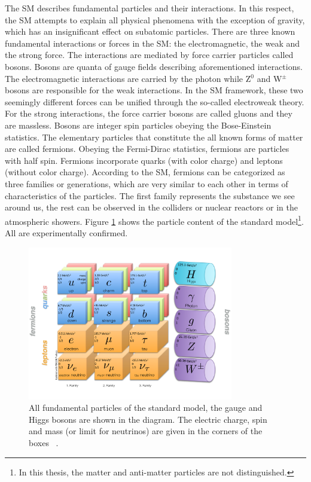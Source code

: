 The SM describes fundamental particles and their interactions. In this respect, the SM attempts to explain all physical phenomena with the exception of gravity, which has an insignificant effect on subatomic particles. There are three known fundamental interactions or forces in the SM: the electromagnetic, the weak and the strong force. The interactions are mediated by force carrier particles called bosons. Bosons are quanta of gauge fields describing aforementioned interactions. The electromagnetic interactions are carried by the photon while Z$^0$ and W$^{\pm}$ bosons are responsible for the weak interactions. In the SM framework, these two seemingly different forces can be unified through the so-called electroweak theory. For the strong interactions, the force carrier bosons are called gluons and they are massless. Bosons are integer spin particles obeying the Bose-Einstein statistics.
The elementary particles that constitute the all known forms of matter are called fermions.
Obeying the Fermi-Dirac statistics, fermions are particles with half spin.  Fermions incorporate quarks (with color charge) and leptons (without color charge). According to the SM, fermions can be categorized as three families or generations, which are very similar to each other in terms of characteristics of the particles. The first family represents the substance we see around us, the rest can be observed in the colliders or nuclear reactors or in the atmospheric showers.   
Figure \ref{fig:SM_particles} shows the particle content  of the standard model\footnote{ In this thesis, the matter and anti-matter particles are not distinguished.}. All are experimentally confirmed. 
\begin{figure}[!hb]
\centering
  \includegraphics[width=0.8\textwidth]{Plots/SM/SM_eng}
  \caption{ All fundamental particles of the standard model, the gauge and Higgs bosons are shown in the diagram. The electric charge, spin and mass (or limit for neutrinos) are given in the corners of the boxes ~\cite{Olive:2016xmw}.
  }
  \label{fig:SM_particles}
\end{figure}
